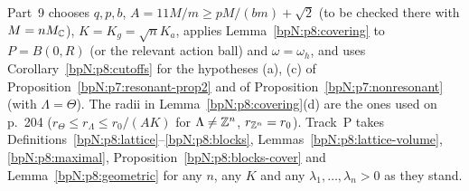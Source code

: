 \begin{remark}[Consumers]\label{bpN:p8:consumers}
Part~9 chooses $q,p,b$, $A=11M/m\ge pM/(bm)+\sqrt2$ (to be checked there with $M=nM_{\mathbb{C}}$), $K=K_g=\sqrt nK_a$, applies Lemma~\ref{bpN:p8:covering} to $P=B(0,R)$ (or the relevant action ball) and $\omega=\omega_h$, and uses Corollary~\ref{bpN:p8:cutoffs} for the hypotheses (a), (c) of Proposition~\ref{bpN:p7:resonant-prop2} and of Proposition~\ref{bpN:p7:nonresonant} (with $\Lambda=\Theta$). The radii in Lemma~\ref{bpN:p8:covering}(d) are the ones used on p.~204 ($r_\Theta\le r_\Lambda\le r_0/(AK)$ for $\Lambda\ne\mathbb{Z}^n$, $r_{\mathbb{Z}^n}=r_0$). Track~P takes Definitions~\ref{bpN:p8:lattice}--\ref{bpN:p8:blocks}, Lemmas~\ref{bpN:p8:lattice-volume}, \ref{bpN:p8:maximal}, Proposition~\ref{bpN:p8:blocks-cover} and Lemma~\ref{bpN:p8:geometric} for any $n$, any $K$ and any $\lambda_1,\dots,\lambda_n>0$ as they stand.
\end{remark}
\endgroup
